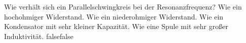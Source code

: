     {Wie verhält sich ein Parallelschwingkreis bei der Resonanzfrequenz?}
    {Wie ein hochohmiger Widerstand.}
    {Wie ein niederohmiger Widerstand.}
    {Wie ein Kondensator mit sehr kleiner Kapazität.}
    {Wie eine Spule mit sehr großer Induktivität.}
    {false}{false}